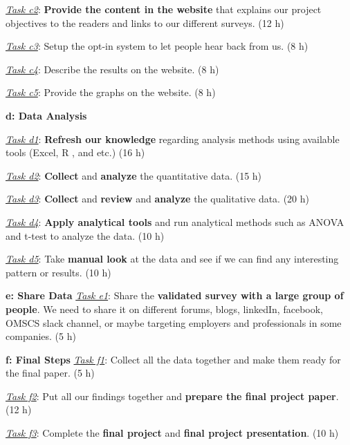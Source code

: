 \documentclass{sigchi}
\begin{document}
\textit{\underline{Task c2}}: \textbf{Provide the content in the website} that explains our project objectives to the readers and links to our different surveys. (12 h)

\textit{\underline{Task c3}}: Setup the opt-in system to let people hear back from us. (8 h)

\textit{\underline{Task c4}}:  Describe the results on the website. (8 h)

\textit{\underline{Task c5}}: Provide the graphs on the website. (8 h)\newline

\textbf{d: Data Analysis}\newline

\textit{\underline{Task d1}}: \textbf{Refresh our knowledge} regarding analysis methods using available tools (Excel, R , and etc.) (16 h)

\textit{\underline{Task d2}}: \textbf{Collect} and \textbf{analyze} the quantitative data. (15 h)

\textit{\underline{Task d3}}: \textbf{Collect} and  \textbf{review} and \textbf{analyze} the qualitative data. (20 h)

\textit{\underline{Task d4}}: \textbf{Apply analytical tools} and run analytical methods such as ANOVA and t-test to analyze the data. (10 h)

\textit{\underline{Task d5}}: Take \textbf{manual look} at the data and see if we can find any interesting pattern or results. (10 h)\newline

\textbf{e: Share Data}\newline
\textit{\underline{Task e1}}: Share the \textbf{validated survey with a large group of people}. We need to share it on different forums, blogs, linkedIn, facebook, OMSCS slack channel, or maybe targeting employers and professionals in some companies. (5 h)\newline

\textbf{f: Final Steps}\newline
\textit{\underline{Task f1}}: Collect all the data together and make them ready for the final paper. (5 h)

\textit{\underline{Task f2}}: Put all our findings together and \textbf{prepare the final project paper}. (12 h)

\textit{\underline{Task f3}}: Complete the \textbf{final project} and \textbf{final project presentation}.  (10 h)\newline
\end{document}
